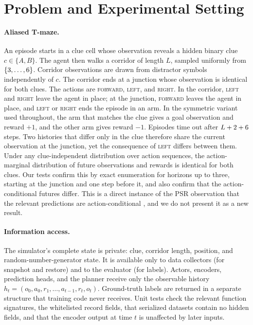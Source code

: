 \section{Problem and Experimental Setting}
\label{sec:setting}

\paragraph{Aliased T-maze.}
An episode starts in a clue cell whose observation reveals a hidden binary clue $c\in\{A,B\}$. The agent then walks a corridor of length $L$, sampled uniformly from $\{3,\dots,6\}$. Corridor observations are drawn from \DiagCfgDistractors{} distractor symbols independently of $c$. The corridor ends at a junction whose observation is identical for both clues. The actions are \textsc{forward}, \textsc{left}, and \textsc{right}. In the corridor, \textsc{left} and \textsc{right} leave the agent in place; at the junction, \textsc{forward} leaves the agent in place, and \textsc{left} or \textsc{right} ends the episode in an arm. In the symmetric variant used throughout, the arm that matches the clue gives a goal observation and reward $+1$, and the other arm gives reward $-1$. Episodes time out after $L+2+6$ steps. Two histories that differ only in the clue therefore share the current observation at the junction, yet the consequence of \textsc{left} differs between them. Under any clue-independent distribution over action sequences, the action-marginal distribution of future observations and rewards is identical for both clues. Our tests confirm this by exact enumeration for horizons up to three, starting at the junction and one step before it, and also confirm that the action-conditional futures differ. This is a direct instance of the PSR observation that the relevant predictions are action-conditional \citep{littman2001psr,singh2004psr}, and we do not present it as a new result.

\paragraph{Information access.}
The simulator's complete state is private: clue, corridor length, position, and random-number-generator state. It is available only to data collectors (for snapshot and restore) and to the evaluator (for labels). Actors, encoders, prediction heads, and the planner receive only the observable history $h_t=(o_0,a_0,r_1,\dots,a_{t-1},r_t,o_t)$. Ground-truth labels are returned in a separate structure that training code never receives. Unit tests check the relevant function signatures, the whitelisted record fields, that serialized datasets contain no hidden fields, and that the encoder output at time $t$ is unaffected by later inputs.

